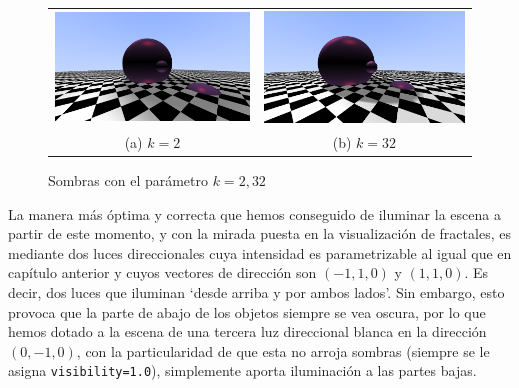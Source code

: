 \begin{figure}[ht]
    \centering
    \begin{tabular}{cc}
        \includegraphics[scale=0.25]{img/C8/sombras-k-2.png} &
      \includegraphics[scale=0.25]{img/C8/sombras-k-32.png} \\    
    (a) $k=2$ & (b) $k=32$  \\
    \end{tabular}
    \caption{Sombras con el parámetro $k=2,32$}
    \label{fig:sombras-k}
\end{figure}

La manera más óptima y correcta que hemos conseguido de iluminar la escena a partir de este momento, y con la mirada puesta en la visualización de fractales, es mediante dos luces direccionales cuya intensidad es parametrizable al igual que en capítulo anterior y cuyos vectores de dirección son $(-1,1,0)$ y $(1,1,0)$. Es decir, dos luces que iluminan `desde arriba y por ambos lados'. Sin embargo, esto provoca que la parte de abajo de los objetos siempre se vea oscura, por lo que hemos dotado a la escena de una tercera luz direccional blanca en la dirección $(0,-1,0)$, con la particularidad de que esta no arroja sombras (siempre se le asigna \verb|visibility=1.0|), simplemente aporta iluminación a las partes bajas.

